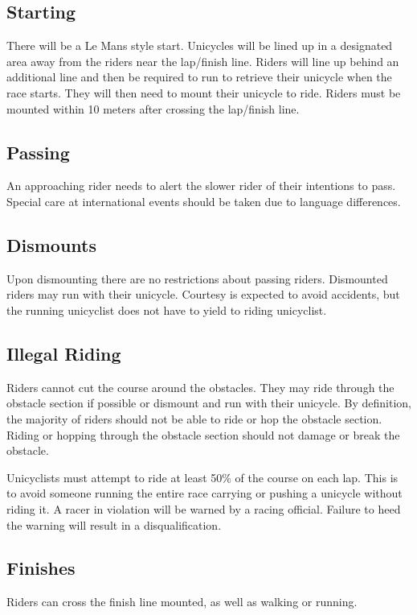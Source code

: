 \subsection{Starting}

There will be a Le Mans style start.
Unicycles will be lined up in a designated area away from the riders near the lap/finish line.
Riders will line up behind an additional line and then be required to run to retrieve their unicycle when the race starts.
They will then need to mount their unicycle to ride.
Riders must be mounted within 10 meters after crossing the lap/finish line.

\subsection{Passing}

An approaching rider needs to alert the slower rider of their intentions to pass.
Special care at international events should be taken due to language differences.

\subsection{Dismounts}

Upon dismounting there are no restrictions about passing riders.
Dismounted riders may run with their unicycle.
Courtesy is expected to avoid accidents, but the running unicyclist does not have to yield to riding unicyclist.

\subsection{Illegal Riding}

Riders cannot cut the course around the obstacles.
They may ride through the obstacle section if possible or dismount and run with their unicycle.
By definition, the majority of riders should not be able to ride or hop the obstacle section.
Riding or hopping through the obstacle section should not damage or break the obstacle.

Unicyclists must attempt to ride at least 50\% of the course on each lap.
This is to avoid someone running the entire race carrying or pushing a unicycle without riding it.
A racer in violation will be warned by a racing official.
Failure to heed the warning will result in a disqualification.

\subsection{Finishes}

Riders can cross the finish line mounted, as well as walking or running.
